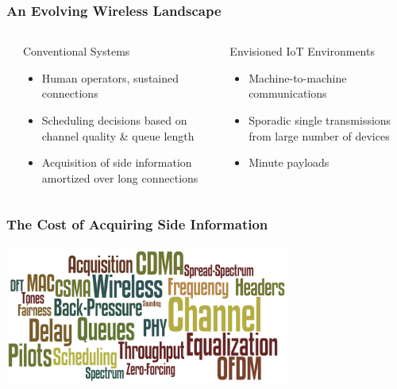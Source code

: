 \documentclass[10pt]{beamer}
\begin{document}
\begin{frame}
\frametitle{An Evolving Wireless Landscape}
\begin{columns}
  \begin{center}
  \scalebox{0.6}{}
  \end{center}
  \begin{block}{Conventional Systems}
  \begin{itemize}
  \item Human operators, sustained connections
  \item Scheduling decisions based on channel quality \& queue length
  \item Acquisition of side information amortized over long connections
  \end{itemize}
  \end{block}
  \begin{block}{Envisioned IoT Environments}
  \begin{itemize}
  \item Machine-to-machine communications
  \item Sporadic single transmissions from large number of devices
  \item Minute payloads
  \end{itemize}
  \end{block}
\end{columns}
\end{frame}


\begin{frame}
\frametitle{The Cost of Acquiring Side Information}
\begin{center}
\includegraphics[width=0.7\textwidth]{Figures/SideInfo2.png}
\end{center}
\vfill
\begin{columns}
  \begin{center}
  \scalebox{0.45}{}
  \end{center}
  \begin{center}
  \scalebox{0.45}{}
  \end{center}
\end{columns}
\end{frame}
\end{document}

